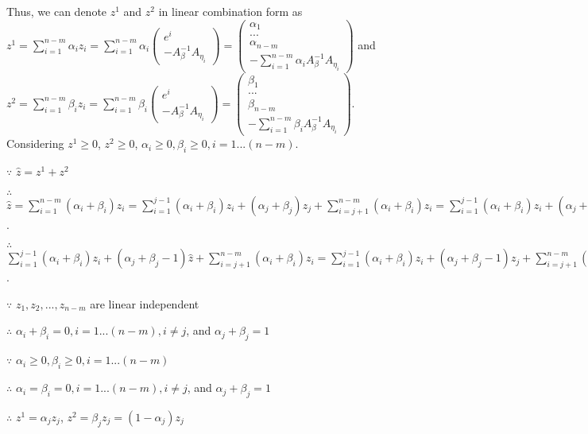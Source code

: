 Thus, we can denote $z^1$ and $z^2$ in linear combination form as $z^1 = \sum_{i=1}^{n-m} \alpha_i z_i =\sum_{i=1}^{n-m} \alpha_i \left( \begin{array}{c} e^i \\ -A_{\beta}^{-1}A_{\eta_i} \end{array}\right) = \left( \begin{array}{c}  \alpha_1 \\...\\\alpha_{n-m} \\ -\sum_{i=1}^{n-m} \alpha_iA_{\beta}^{-1}A_{\eta_i} \end{array}\right) $ and $z^2= \sum_{i=1}^{n-m} \beta_i z_i= \sum_{i=1}^{n-m} \beta_i \left( \begin{array}{c} e^i \\ -A_{\beta}^{-1}A_{\eta_i} \end{array}\right) = \left( \begin{array}{c}  \beta_1 \\...\\\beta_{n-m} \\ -\sum_{i=1}^{n-m} \beta_iA_{\beta}^{-1}A_{\eta_i} \end{array}\right)$.  Considering $z^1\geq0$, $z^2\geq0$, $\alpha_i\geq0, \beta_i\geq0, i=1...(n-m)$.

$\because$ $\widehat{z}=z^1+z^2$

$\therefore$ $\widehat{z}=\sum_{i=1}^{n-m} (\alpha_i+\beta_i) z_i =\sum_{i=1}^{j-1} (\alpha_i+\beta_i) z_i +(\alpha_j+\beta_j)z_j +  \sum_{i=j+1}^{n-m}  (\alpha_i+\beta_i)z_i =\sum_{i=1}^{j-1} (\alpha_i+\beta_i) z_i +(\alpha_j+\beta_j)\widehat{z} +  \sum_{i=j+1}^{n-m}  (\alpha_i+\beta_i)z_i$.

$\therefore$ $\sum_{i=1}^{j-1} (\alpha_i+\beta_i) z_i +(\alpha_j+\beta_j-1)\widehat{z} +  \sum_{i=j+1}^{n-m}  (\alpha_i+\beta_i)z_i=\sum_{i=1}^{j-1} (\alpha_i+\beta_i) z_i +(\alpha_j+\beta_j-1) z_j +  \sum_{i=j+1}^{n-m}  (\alpha_i+\beta_i)z_i =0 $.

$\because$ $z_1, z_2, ..., z_{n-m}$ are linear independent

$\therefore$ $\alpha_i+\beta_i=0, i=1...(n-m), i\neq j$, and $\alpha_j+\beta_j=1$

$\because$ $\alpha_i\geq0, \beta_i\geq0, i=1...(n-m)$

$\therefore$ $\alpha_i=\beta_i=0, i=1...(n-m), i\neq j$, and $\alpha_j+\beta_j=1$

$\therefore$ $z^1=\alpha_jz_j$, $z^2=\beta_jz_j=(1-\alpha_j)z_j$

